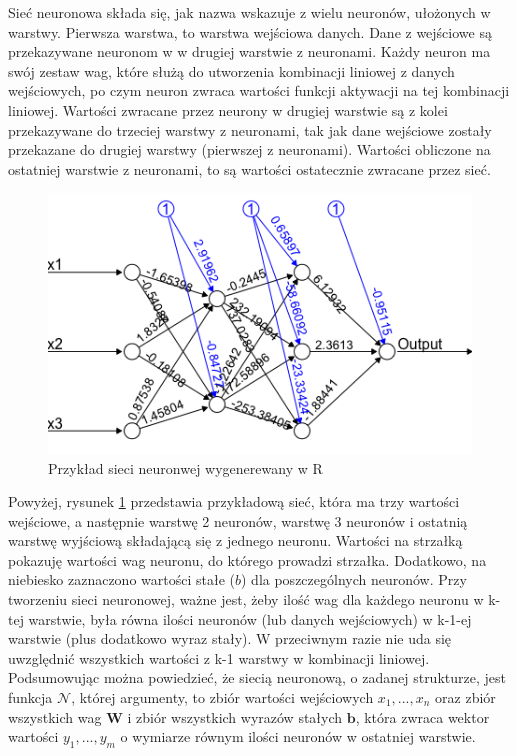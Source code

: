 \documentclass[licencjacka]{pracamgr}
\begin{document}
Sieć neuronowa składa się, jak nazwa wskazuje z wielu neuronów, ułożonych w warstwy. Pierwsza warstwa, to warstwa wejściowa danych. Dane z wejściowe są przekazywane neuronom w w drugiej warstwie z neuronami. Każdy neuron ma swój zestaw wag, które służą do utworzenia kombinacji liniowej z danych wejściowych, po czym neuron zwraca wartości funkcji aktywacji na tej kombinacji liniowej. Wartości zwracane przez neurony w drugiej warstwie są z kolei przekazywane do trzeciej warstwy z neuronami, tak jak dane wejściowe zostały przekazane do drugiej warstwy (pierwszej z neuronami).  Wartości obliczone na ostatniej warstwie z neuronami, to są wartości ostatecznie zwracane przez sieć. 

\begin{figure}[h!]
	\includegraphics [scale=0.7]{nn_example.png}
	\caption{Przykład sieci neuronwej wygenerewany w R}
	\label{Rys22}
\end{figure}

Powyżej, rysunek \ref{Rys22} przedstawia przykładową sieć, która ma trzy wartości wejściowe, a następnie warstwę 2 neuronów, warstwę 3 neuronów i ostatnią warstwę wyjściową składającą się z jednego neuronu. Wartości na strzałką pokazuję wartości wag neuronu, do którego prowadzi strzałka. Dodatkowo, na niebiesko zaznaczono wartości stałe ($b$) dla poszczególnych neuronów. Przy tworzeniu sieci neuronowej, ważne jest, żeby ilość wag dla każdego neuronu w k-tej warstwie, była równa ilości neuronów (lub danych wejściowych) w k-1-ej warstwie (plus dodatkowo wyraz stały). W przeciwnym razie nie uda się uwzględnić wszystkich wartości z k-1 warstwy w kombinacji liniowej.  \\
 
Podsumowując można powiedzieć, że siecią neuronową, o zadanej strukturze, jest funkcja $\mathbf{\mathcal{N}}$, której argumenty, to zbiór wartości wejściowych $x_{1},...,x_{n}$ oraz zbiór wszystkich wag $\mathbf{W}$ i zbiór wszystkich wyrazów stałych $\mathbf{b}$, która zwraca wektor wartości $y_{1},...,y_{m}$ o wymiarze równym ilości neuronów w ostatniej warstwie.
\end{document}

